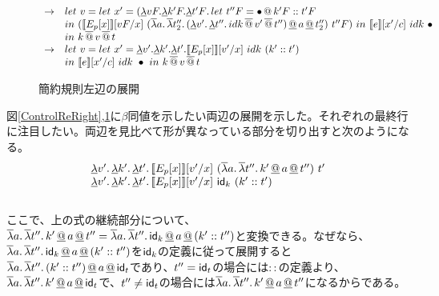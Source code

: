 \begin{figure}
\[\begin{array}{cl}

 \to & let\ v=let\ x'= (\DLamS vF.\DLamS k'F.\DLam{t'F}
                {let\ t''F=\Append{\bullet}{\Cons{k'F}{t'F}}}\\
  & in\ (
     \CPSTh{E_p[x]}[\Change{x}{vF}]\
        \SLamP{a}{\SLam{t_2''}{\DLamP{v'}{\DLam{t''}
                        {\SApp{\SApp{idk}{v'}}{t''}}} \DAppS a \DAppS t_2''}}\ t''F
        )\ in\ \CPSTh{e}[\Change{c}{x'}]\ idk\ \bullet \ \\
        & in\
        k\SAppS v \SAppS t\\


  \to & let\ v=let\ x'= \DLamS v'.\DLamS k'.\DLamS t'.

     \CPSTh{E_p[x]}[\Change{x}{v'}]\
        idk\ \ConsP{k'}{t'}\\
                    & in\ \CPSTh{e}[\Change{c}{x'}]\ idk\ \bullet \ in\
                k\SAppS v \SAppS t\\

\end{array}
\]
\caption{簡約規則左辺の展開}
\label{ControlReLeft}
\end{figure}

図\ref{ControlReRight},\ref{ControlReLeft}に$\beta$同値を示したい両辺の展開を示した。それぞれの最終行に注目したい。両辺を見比べて形が異なっている部分を切り出すと次のようになる。\\
\[
\begin{array}{l}
  \DLam{v'}{\DLam{k'}{\DLam{t'}{\CPSTh{E_p[x]}[\Change{x}{v'}]\
        \SLamP{a}{\SLam{t''}{k' \DAppS a \DAppS t''}}\ t'}}}\\
  \DLamS v'.\,\DLamS k'.\,\DLamS t'.\,

     \CPSTh{E_p[x]}[\Change{x}{v'}]\
     \Idk\ \ConsP{k'}{t'}\\
     
\end{array}
\]
\\
ここで、上の式の継続部分について、$\SLam{a}{\SLam{t''}{k' \DAppS a \DAppS t''}}=\SLam{a}{\SLam{t''}{\Idk \DAppS a \DAppS \ConsP{k'}{t''}}}$と変換できる。なぜなら、$\SLam{a}{\SLam{t''}{\Idk \DAppS a \DAppS \ConsP{k'}{t''}}}$を$\Idk$の定義に従って展開すると
$\SLam{a}{\SLam{t''}{\ConsP{k'}{t''}} \DAppS a \DAppS \Idt}$であり、$t''=\Idt$の場合には$::$の定義より、$\SLam{a}{\SLam{t''}{k' \DAppS a \DAppS \Idt}}$で、$t''\neq \Idt$の場合には$\SLam{a}{\SLam{t''}{k' \DAppS a \DAppS t''}}$になるからである。

